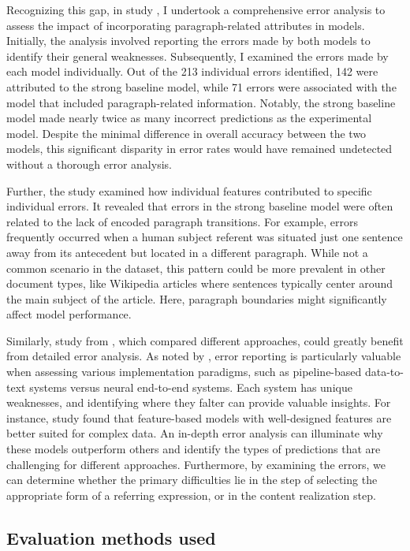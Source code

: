 Recognizing this gap, in study \studE, I undertook a comprehensive error analysis to assess the impact of incorporating paragraph-related attributes in \context models.  Initially, the analysis involved reporting the errors made by both models to identify their general weaknesses. Subsequently, I examined the errors made by each model individually. Out of the 213 individual errors identified, 142 were attributed to the strong baseline model, while 71 errors were associated with the model that included paragraph-related information. Notably, the strong baseline model made nearly twice as many incorrect predictions as the experimental model. Despite the minimal difference in overall accuracy between the two models, this significant disparity in error rates would have remained undetected without a thorough error analysis.

Further, the study examined how individual features contributed to specific individual errors. It revealed that errors in the strong baseline model were often related to the lack of encoded paragraph transitions. For example, errors frequently occurred when a human subject referent was situated just one sentence away from its antecedent but located in a different paragraph. While not a common scenario in the \wsj dataset, this pattern could be more prevalent in other document types, like Wikipedia articles where sentences typically center around the main subject of the article. Here, paragraph boundaries might significantly affect model performance.

Similarly, study \studF from , which compared different \context approaches, could greatly benefit from detailed error analysis.
As noted by \citet{van-miltenburg-etal-2021-underreporting}, error reporting is particularly valuable when assessing various implementation paradigms, such as pipeline-based data-to-text systems versus neural end-to-end systems. Each system has unique weaknesses, and identifying where they falter can provide valuable insights. For instance, study \studF found that feature-based models with well-designed features are better suited for complex data. An in-depth error analysis can illuminate why these models outperform others and identify the types of predictions that are challenging for different approaches. Furthermore, by examining the errors, we can determine whether the primary difficulties lie in the step of selecting the appropriate form of a referring expression, or in the content realization step.

\subsection{Evaluation methods used}\label{chap8_subsec:evaluation}

